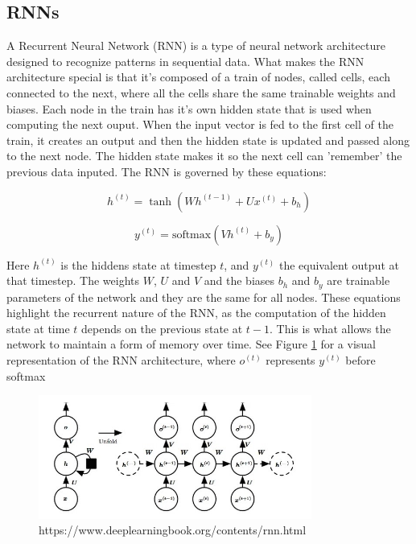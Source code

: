 \documentclass[11pt]{article}
\begin{document}
\subsection{RNNs}
A Recurrent Neural Network (RNN) is a type of neural network architecture designed to recognize patterns in sequential data. What makes the RNN architecture special is that it's composed of a train of nodes, called cells, each connected to the next, where all the cells share the same trainable weights and biases. Each node in the train has it's own hidden state that is used when computing the next ouput. When the input vector is fed to the first cell of the train, it creates an output and then the hidden state is updated and passed along to the next node. The hidden state makes it so the next cell can 'remember' the previous data inputed. The RNN is governed by these equations:

\begin{equation}
h^{(t)} = \tanh(Wh^{(t-1)} + Ux^{(t)} + b_h)
\end{equation}

\begin{equation}
y^{(t)} = \text{softmax}(Vh^{(t)} + b_y)
\end{equation}

Here \(h^{(t)}\) is the hiddens state at timestep $t$, and \(y^{(t)}\) the equivalent output at that timestep. The weights $W$, $U$ and $V$ and the biases $b_h$ and $b_y$ are trainable parameters of the network and they are the same for all nodes. These equations highlight the recurrent nature of the RNN, as the computation of the hidden state at time $t$ depends on the previous state at $t-1$. This is what allows the network to maintain a form of memory over time. See Figure \ref{fig:rnn_diagram} for a visual representation of the RNN architecture, where $o^{(t)}$ represents $y^{(t)}$ before softmax

\begin{figure}[h]
\centering
\includegraphics[width=0.8\textwidth]{rnn_diagram.jpeg}
\caption{https://www.deeplearningbook.org/contents/rnn.html}
\label{fig:rnn_diagram}
\end{figure}
\end{document}
